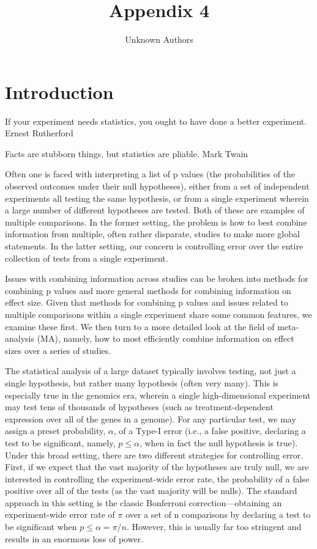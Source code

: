 \documentclass{article}
\title{Appendix 4}
\author{Unknown Authors}
\date{}
\begin{document}
\maketitle

\begin{abstract}

\end{abstract}

\section{Introduction}
If your experiment needs statistics, you ought to have done a better experiment. Ernest Rutherford

Facts are stubborn things, but statistics are pliable. Mark Twain

Often one is faced with interpreting a list of p values (the probabilities of the observed outcomes under their null hypotheses), either from a set of independent experiments all testing the same hypothesis, or from a single experiment wherein a large number of different hypotheses are tested. Both of these are examples of multiple comparisons. In the former setting, the problem is how to best combine information from multiple, often rather disparate, studies to make more global statements. In the latter setting, our concern is controlling error over the entire collection of tests from a single experiment.

Issues with combining information across studies can be broken into methods for combining p values and more general methods for combining information on effect size. Given that methods for combining p values and issues related to multiple comparisons within a single experiment share some common features, we examine these first. We then turn to a more detailed look at the field of meta-analysis (MA), namely, how to most efficiently combine information on effect sizes over a series of studies.

The statistical analysis of a large dataset typically involves testing, not just a single hypothesis, but rather many hypothesis (often very many). This is especially true in the genomics era, wherein a single high-dimensional experiment may test tens of thousands of hypotheses (such as treatment-dependent expression over all of the genes in a genome). For any particular test, we may assign a preset probability,  $ \alpha $, of a Type-I error (i.e., a false positive, declaring a test to be significant, namely,  $ p \leq \alpha $, when in fact the null hypothesis is true). Under this broad setting, there are two different strategies for controlling error. First, if we expect that the vast majority of the hypotheses are truly null, we are interested in controlling the experiment-wide error rate, the probability of a false positive over all of the tests (as the vast majority will be nulls). The standard approach in this setting is the classic Bonferroni correction—obtaining an experiment-wide error rate of  $ \pi $ over a set of n comparisons by declaring a test to be significant when  $ p \leq \alpha = \pi/n $. However, this is usually far too stringent and results in an enormous loss of power.
\end{document}
